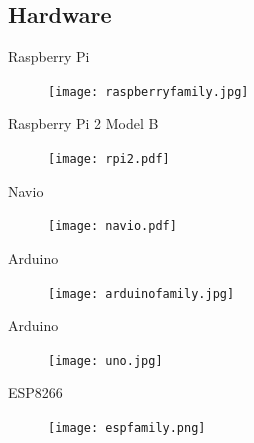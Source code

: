 \subsection*{Hardware}
\begin{frame}{Raspberry Pi}
	\begin{figure}[H]
		\texttt{[image: raspberryfamily.jpg]}\footnotemark
	\end{figure}
	
\end{frame}

\begin{frame}{Raspberry Pi 2 Model B}
	\begin{figure}[H]
		\texttt{[image: rpi2.pdf]}\footnotemark
	\end{figure}
\end{frame}

\begin{frame}{Navio}
	\begin{figure}[H]
		\texttt{[image: navio.pdf]}\footnotemark
	\end{figure}
	
\end{frame}

\begin{frame}{Arduino}
	\begin{figure}[H]
		\texttt{[image: arduinofamily.jpg]}\footnotemark
	\end{figure}
	
\end{frame}

\begin{frame}{Arduino}
	\begin{figure}[H]
		\texttt{[image: uno.jpg]}
	\end{figure}
\end{frame}

\begin{frame}{ESP8266}
	\begin{figure}[H]
		\texttt{[image: espfamily.png]}\footnotemark
	\end{figure}
	
\end{frame}

